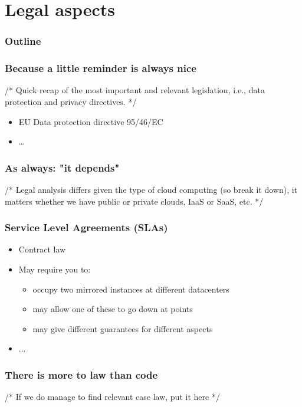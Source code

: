 \documentclass{beamer}
\begin{document}
\section{Legal aspects}

\begin{frame}
  \frametitle{Outline}
\end{frame}

\begin{frame}
    \frametitle{Because a little reminder is always nice}
    /* Quick recap of the most important and relevant legislation, i.e., data
    protection and privacy directives. */
    \begin{itemize}	
    \item EU Data protection directive 95/46/EC
    \item \dots
    \end{itemize}
\end{frame}

\begin{frame}
    \frametitle{As always: "it depends"}
    /* Legal analysis differs given the type of cloud computing (so break it
    down), it matters whether we have public or private clouds, IaaS or SaaS,
    etc. */
\end{frame}

\begin{frame}
    \frametitle{Service Level Agreements (SLAs)}
    \begin{itemize}
    \item Contract law
    \item May require you to:
      \begin{itemize} %
        \item occupy two mirrored instances at different datacenters
        \item may allow one of these to go down at points
        \item may give different guarantees for different aspects
      \end{itemize}
    \item ...
    \end{itemize}
\end{frame}

\begin{frame}
    \frametitle{There is more to law than code}
    /* If we do manage to find relevant case law, put it here */
\end{frame}
\end{document}
